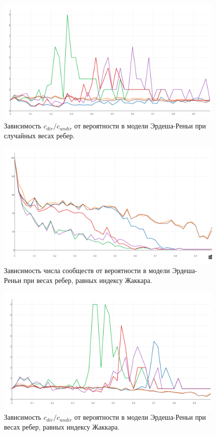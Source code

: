 	\begin{figure}
		\centering
		\includegraphics[width=\textwidth]{pics/random_d.png}
		\caption{Зависимость $c_{dir}/c_{undir}$ от вероятности в модели Эрдеша-Реньи при случайных весах ребер.}
		\label{fig:cc_er_r}
	\end{figure}
	
	\begin{figure}
		\centering
		\includegraphics[width=\textwidth]{pics/jaccard_count.png}
		\caption{Зависимость числа сообществ от вероятности в модели Эрдеша-Реньи при весах ребер, равных индексу Жаккара.}
		\label{fig:c_er_j}
	\end{figure}

	\begin{figure}
		\centering
		\includegraphics[width=\textwidth]{pics/jaccard_d.png}
		\caption{Зависимость $c_{dir}/c_{undir}$ от вероятности в модели Эрдеша-Реньи при весах ребер, равных индексу Жаккара.}
		\label{fig:cc_er_j}
	\end{figure}
	

